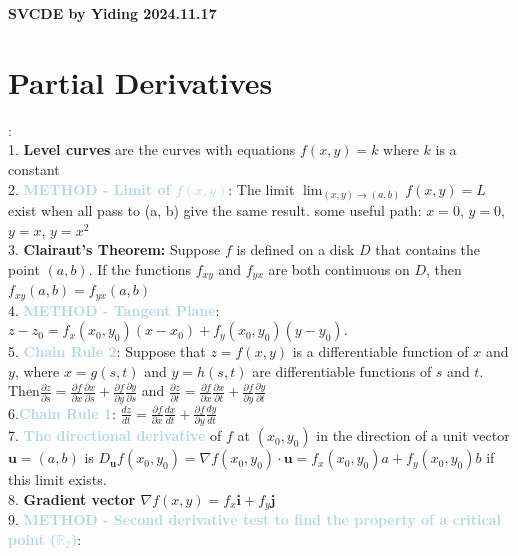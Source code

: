 \documentclass[twocolumn]{article}
\newcommand{\method}[1]{\textbf{\textcolor{lightblue}{#1}}}
\newcommand{\properties}[1]{\textbf{\textcolor{rosered}{#1}}}
\begin{document}
\thispagestyle{empty}
\RaggedRight
\begin{center}
  {\large\color{headcolor}\textbf{SVCDE by Yiding 2024.11.17}}  \\
\end{center}

\section{Partial  Derivatives}
:\\
1. \textbf{Level curves} are the curves with equations $f(x,y) = k$ where $k$ is a constant\\
2. \method{METHOD - Limit of $f(x,y)$}: The limit $\lim_{(x, y) \to (a, b)} f(x, y) = L$ exist when all pass to (a, b) give the same result.  some useful path: $x = 0$, $ y = 0$, $y = x$, $y = x^2$\\
3. \textbf{Clairaut's Theorem:} Suppose $f$ is defined on a disk $D$ that contains the point $(a, b)$. If the functions $f_{xy}$ and $f_{yx}$ are both continuous on $D$, then
$f_{xy}(a, b) = f_{yx}(a, b)$\\
4. \method{METHOD - Tangent Plane}: $z - z_0 = f_x(x_0, y_0)(x - x_0) + f_y(x_0, y_0)(y - y_0).$\\
5. \method{\textbf{Chain Rule 2}}: Suppose that \( z = f(x, y) \) is a differentiable function of \( x \) and \( y \), where \( x = g(s, t) \) and \( y = h(s, t) \) are differentiable functions of \( s \) and \( t \). Then$\frac{\partial z}{\partial s} = \frac{\partial f}{\partial x} \frac{\partial x}{\partial s} + \frac{\partial f}{\partial y} \frac{\partial y}{\partial s}$ and $\frac{\partial z}{\partial t} = \frac{\partial f}{\partial x} \frac{\partial x}{\partial t} + \frac{\partial f}{\partial y} \frac{\partial y}{\partial t}$\\
6.\method{Chain Rule 1}: $\frac{dz}{dt} = \frac{\partial f}{\partial x} \frac{dx}{dt} + \frac{\partial f}{\partial y} \frac{dy}{dt}$\\
7. \method{\textbf{The directional derivative}} of \( f \) at \( (x_0, y_0) \) in the direction of a unit vector \( \mathbf{u} = (a, b) \) is $D_{\mathbf{u}} f(x_0, y_0) = \nabla f(x_0, y_0) \cdot \mathbf{u} =  f_x(x_0, y_0) a + f_y(x_0, y_0) b$ if this limit exists.\\
8. \textbf{Gradient vector $\nabla f(x, y)  = f_x \mathbf{i} + f_y \mathbf{j}$}\\
9. \method{METHOD - Second derivative test to find the property of a critical point (\properties{$\mathbb{R}_2$})}: \\
\end{document}

